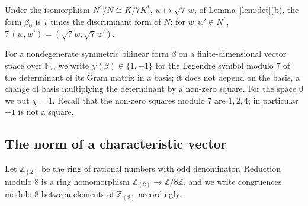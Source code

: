 \documentclass[11pt,a4paper]{article}
\theoremstyle{definition}
\theoremstyle{remark}
\newcommand{\ZZ}{\mathbb{Z}}
\newcommand{\FF}{\mathbb{F}}
\begin{document}
Under the isomorphism $N^*/N\cong K/7K^*$, $w\mapsto\sqrt7\,w$, of Lemma~\ref{lem:det}(b), the form $\beta_0$ is $7$
times the discriminant form of $N$: for $w,w'\in N^*$, $7\,(w,w')=(\sqrt7w,\sqrt7w')$.

For a nondegenerate symmetric bilinear form $\beta$ on a finite-dimensional vector space over $\FF_7$, we write
$\chi(\beta)\in\{1,-1\}$ for the Legendre symbol modulo $7$ of the determinant of its Gram matrix in a basis; it does
not depend on the basis, a change of basis multiplying the determinant by a non-zero square. For the space $0$ we put
$\chi=1$. Recall that the non-zero squares modulo $7$ are $1,2,4$; in particular $-1$ is not a square.

\subsection{The norm of a characteristic vector}
Let $\ZZ_{(2)}$ be the ring of rational numbers with odd denominator. Reduction modulo $8$ is a ring homomorphism
$\ZZ_{(2)}\to\ZZ/8\ZZ$, and we write congruences modulo $8$ between elements of $\ZZ_{(2)}$ accordingly.
\end{document}
